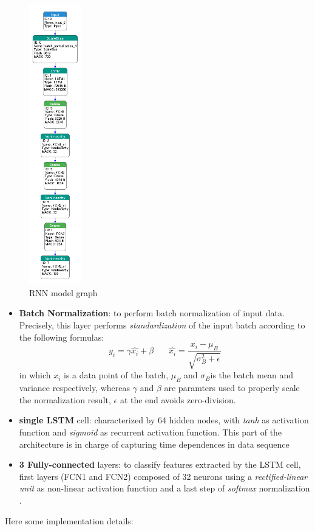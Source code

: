 \begin{figure}
	\hfill\includegraphics[width=0.2\textwidth]{figures/rnn.png}\hspace*{\fill}
	\caption{RNN model graph}\label{fig:9}
	\centering
	\vspace{-250pt}
\end{figure}
\noindent
\begin{itemize}
	\item \textbf{Batch Normalization}: to perform batch normalization of input data. Precisely, this layer performs \textit{standardization} of the input batch according to the following formulas:
	\[
		 y_{i} = \gamma \hat{x_{i}} + \beta \ \ \ \ \ \ \ \ 
		 \hat{x_{i}} = \frac{x_{i} - \mu_{B}}{\sqrt{\sigma_{B}^2 + \epsilon}}
	\]
	in which $x_{i}$ is a data point of the batch, $ \mu_{B} $ and $ \sigma_{B} $is the batch mean and variance respectively, whereas $ \gamma $ and $ \beta $ are paramters used to properly scale the normalization result, $ \epsilon $ at the end avoids zero-division. 
	\item \textbf{single LSTM} cell: characterized by 64 hidden nodes, with \textit{tanh} as activation function and \textit{sigmoid} as recurrent activation function. This part of the architecture is in charge of capturing time dependences in data sequence  
	\item \textbf{3 Fully-connected} layers: to classify features extracted by the LSTM cell, first layers (FCN1 and FCN2) composed of 32 neurons using a \textit{rectified-linear unit} as non-linear activation function and a last step of \textit{softmax} normalization . 
\end{itemize}
Here some implementation details:


